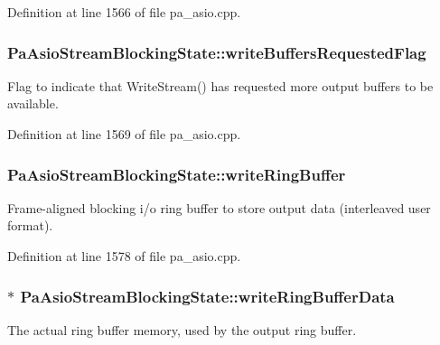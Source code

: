 Definition at line 1566 of file pa\+\_\+asio.\+cpp.

\subsubsection[{\texorpdfstring{write\+Buffers\+Requested\+Flag}{writeBuffersRequestedFlag}}]{ Pa\+Asio\+Stream\+Blocking\+State\+::write\+Buffers\+Requested\+Flag}\hypertarget{struct_pa_asio_stream_blocking_state_ac41f9b20abaf565ddee10ba390f2c9e7}{}\label{struct_pa_asio_stream_blocking_state_ac41f9b20abaf565ddee10ba390f2c9e7}
Flag to indicate that Write\+Stream() has requested more output buffers to be available. 

Definition at line 1569 of file pa\+\_\+asio.\+cpp.

\subsubsection[{\texorpdfstring{write\+Ring\+Buffer}{writeRingBuffer}}]{ Pa\+Asio\+Stream\+Blocking\+State\+::write\+Ring\+Buffer}\hypertarget{struct_pa_asio_stream_blocking_state_ab9875e6148cce05acff1774e0cbb4bd5}{}\label{struct_pa_asio_stream_blocking_state_ab9875e6148cce05acff1774e0cbb4bd5}
Frame-\/aligned blocking i/o ring buffer to store output data (interleaved user format). 

Definition at line 1578 of file pa\+\_\+asio.\+cpp.

\subsubsection[{\texorpdfstring{write\+Ring\+Buffer\+Data}{writeRingBufferData}}]{$\ast$ Pa\+Asio\+Stream\+Blocking\+State\+::write\+Ring\+Buffer\+Data}\hypertarget{struct_pa_asio_stream_blocking_state_af4645b9cd24335efe520d1a1894d39e6}{}\label{struct_pa_asio_stream_blocking_state_af4645b9cd24335efe520d1a1894d39e6}
The actual ring buffer memory, used by the output ring buffer. 

